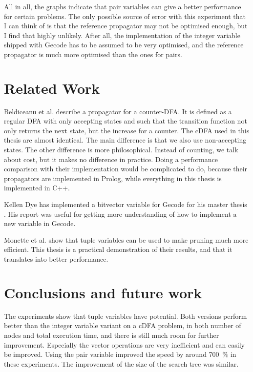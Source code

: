 \documentclass[a4paper,11pt]{article}
\begin{document}
All in all, the graphs indicate that pair variables can give a better performance for certain problems. The only possible source of error with this experiment that I can think of is that the reference propagator may not be optimised enough, but I find that highly unlikely. After all, the implementation of the integer variable shipped with Gecode has to be assumed to be very optimised, and the reference propagator is much more optimised than the ones for pairs.

\section{Related Work}
Beldiceanu et al. \cite{Beldiceanu675954} describe a propagator for a counter-DFA. It is defined as a regular DFA with only accepting states and such that the transition function not only returns the next state, but the increase for a counter. The cDFA used in this thesis are almost identical. The main difference is that we also use non-accepting states. The other difference is more philosophical. Instead of counting, we talk about cost, but it makes no difference in practice. Doing a performance comparison with their implementation would be complicated to do, because their propagators are implemented in Prolog, while everything in this thesis is implemented in C++.

Kellen Dye has implemented a bitvector variable for Gecode for his master thesis \cite{Dye761927}. His report was useful for getting more understanding of how to implement a new variable in Gecode.

Monette et al.\cite{Monette771427} show that tuple variables can be used to make pruning much more efficient. This thesis is a practical demonstration of their results, and that it translates into better performance.

\section{Conclusions and future work}
The experiments show that tuple variables have potential. Both versions perform better than the integer variable variant on a cDFA problem, in both number of nodes and total execution time, and there is still much room for further improvement. Especially the vector operations are very inefficient and can easily be improved. Using the pair variable improved the speed by around \SI{700}{\percent} in these experiments. The improvement of the size of the search tree was similar.
\end{document}
